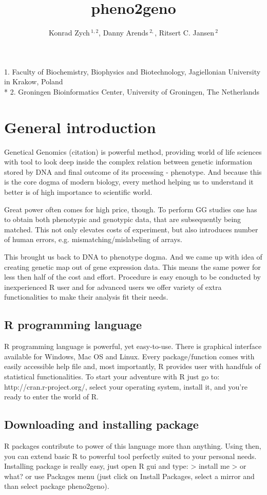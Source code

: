 \documentclass{article}
\begin{document}
\title {pheno2geno}
\author{
Konrad Zych\,$^{1,2}$, 
Danny Arends\,$^{2,}$,
 Ritsert C. Jansen\,$^{2}$
}
\maketitle
{\noindent}1. Faculty of Biochemistry, Biophysics and Biotechnology, Jagiellonian University in Krakow, Poland \\*
2. Groningen Bioinformatics Center, University of Groningen, The Netherlands

\newpage
\section{General introduction}
\begin{multicols}{2}
{\noindent}Genetical Genomics (citation) is powerful method, providing world of life sciences with tool to look deep inside the complex relation between genetic information stored by DNA and final outcome of its processing - phenotype. And because this is the core dogma of modern biology, every method helping us to understand it better is of high importance to scientific world. 

{\noindent}Great power often comes for high price, though. To perform GG studies one has to obtain both phenotypic and genotypic data, that are subsequently being matched. This not only elevates costs of experiment, but also introduces number of human errors, e.g. mismatching/mislabeling of arrays.

{\noindent}This brought us back to DNA to phenotype dogma. And we came up with idea of creating genetic map out of gene expression data. This means the same power for less then half of the cost and effort. Procedure is easy enough to be conducted by inexperienced R user and for advanced users we offer variety of extra functionalities to make their analysis fit their needs.
\subsection{R programming language}
R programming language is powerful, yet easy-to-use. There is graphical interface available for Windows, Mac OS and Linux. Every package/function comes with easily accessible help file and, most importantly, R provides user with handfuls of statistical functionalities. To start your adventure with R just go to: http://cran.r-project.org/, select your operating system, install it, and you're ready to enter the world of R.
\subsection{Downloading and installing package}
R packages contribute to power of this language more than anything. Using then, you can extend basic R to powerful tool perfectly suited to your personal needs. Installing package is really easy, just open R gui and type:
> install me
> or what?
or use Packages menu (just click on Install Packages, select a mirror and than select package pheno2geno).
\end{multicols}
\newpage
\end{document}
